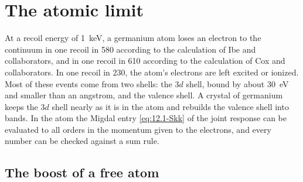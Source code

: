 \section{The atomic limit}\label{sec:12.2}

At a recoil energy of \SI{1}{keV}, a germanium atom loses an electron to the continuum in one recoil in 580 according to the calculation of Ibe and collaborators, and in one recoil in 610 according to the calculation of Cox and collaborators. In one recoil in 230, the atom's electrons are left excited or ionized. Most of these events come from two shells: the $3d$ shell, bound by about \SI{30}{eV} and smaller than an angstrom, and the valence shell. A crystal of germanium keeps the $3d$ shell nearly as it is in the atom and rebuilds the valence shell into bands. In the atom the Migdal entry \cref{eq:12.1-Skk} of the joint response can be evaluated to all orders in the momentum given to the electrons, and every number can be checked against a sum rule.

\subsection{The boost of a free atom}\label{sec:12.2-boost}

